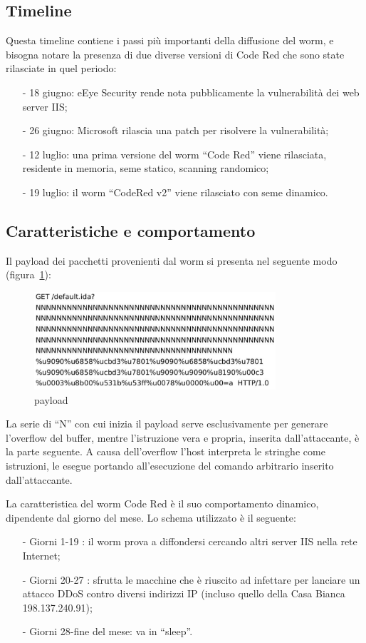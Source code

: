 \subsection{Timeline}
Questa timeline contiene i passi più importanti della diffusione del worm, e bisogna notare la presenza di due diverse versioni di Code Red che sono state rilasciate in quel periodo:
\begin{itemize}
\item[-]18 giugno: eEye Security rende nota pubblicamente la vulnerabilità dei web server IIS;
\item[-]26 giugno: Microsoft rilascia una patch per risolvere la vulnerabilità;
\item[-]12 luglio: una prima versione del worm “Code Red” viene rilasciata, residente in memoria, seme statico, scanning randomico;
\item[-]19 luglio: il worm “CodeRed v2” viene rilasciato con seme dinamico.
\end{itemize}
\subsection{Caratteristiche e comportamento}
Il payload dei pacchetti provenienti dal worm si presenta nel seguente modo (figura~\ref{payload}):
\begin{figure}[!h]
\centering
\includegraphics[width=0.8\textwidth]{images/payload.eps}
\caption{payload}
\label{payload}
\end{figure}
La serie di “N” con cui inizia il payload serve esclusivamente per generare l’overflow del buffer, mentre l’istruzione vera e propria, inserita dall’attaccante, è la parte seguente. A causa dell’overflow l’host interpreta le stringhe come istruzioni, le esegue portando all’esecuzione del comando arbitrario inserito dall’attaccante.

La caratteristica del worm Code Red è il suo comportamento dinamico, dipendente dal giorno del mese. Lo schema utilizzato è il seguente:
\begin{itemize}
\item[-]Giorni 1-19 : il worm prova a diffondersi cercando altri server IIS nella rete Internet;
\item[-]Giorni 20-27 : sfrutta le macchine che è riuscito ad infettare per lanciare un attacco DDoS contro diversi indirizzi IP (incluso quello della Casa Bianca 198.137.240.91);
\item[-]Giorni 28-fine del mese: va in “sleep”.
\end{itemize}
